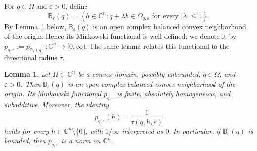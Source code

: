 \documentclass[11pt]{article}
\newtheorem{lemma}[theorem]{Lemma}
\theoremstyle{definition}
\newcommand{\C}{\mathbb{C}}
\newcommand{\eps}{\varepsilon}
\begin{document}
For \(q\in\Omega\) and \(\eps>0\), define
\begin{equation*}
\mathbb B_\eps(q)=\left\{h\in\C^n:q+\lambda h\in\Omega_{q,\eps}\text{ for every }|\lambda|\le1\right\}.
\end{equation*}
By Lemma~\ref{lem:directional-norm} below, \(\mathbb B_\eps(q)\) is an
open complex balanced convex neighborhood of the origin.  Hence its
Minkowski functional is well defined; we denote it by
\(p_{q,\eps}:=p_{\mathbb B_\eps(q)}:\C^n\to[0,\infty)\).  The same lemma
relates this functional to the directional radius \(\tau\).

\begin{lemma}\label{lem:directional-norm}
	Let \(\Omega\subset\C^n\) be a convex domain, possibly unbounded,
	\(q\in\Omega\), and \(\eps>0\).  Then
	\(\mathbb B_\eps(q)\) is an open complex balanced convex neighborhood
	of the origin.  Its Minkowski functional \(p_{q,\eps}\) is finite,
	absolutely homogeneous, and subadditive.  Moreover, the identity
	\begin{equation*}
		p_{q,\eps}(h)
		=
		\frac{1}{\tau(q,h,\eps)}
	\end{equation*}
	holds for every \(h\in\C^n\setminus\{0\}\), with \(1/\infty\)
	interpreted as \(0\).  In particular, if
	\(\mathbb B_\eps(q)\) is bounded, then \(p_{q,\eps}\) is a norm on
	\(\C^n\).
\end{lemma}
\end{document}
